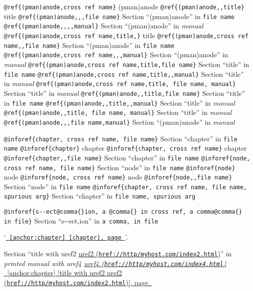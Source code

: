 \documentclass{book}
\begin{document}
\texttt{@ref\{(pman)anode,cross ref name\}} (pman)anode
\texttt{@ref\{(pman)anode,,title\}} title
\texttt{@ref\{(pman)anode,,,file name\}} Section ``(pman)anode'' in \texttt{file name}
\texttt{@ref\{(pman)anode,,,,manual\}} Section ``(pman)anode'' in \textsl{manual}
\texttt{@ref\{(pman)anode,cross ref name,title,\}} title
\texttt{@ref\{(pman)anode,cross ref name,,file name\}} Section ``(pman)anode'' in \texttt{file name}
\texttt{@ref\{(pman)anode,cross ref name,,,manual\}} Section ``(pman)anode'' in \textsl{manual}
\texttt{@ref\{(pman)anode,cross ref name,title,file name\}} Section ``title'' in \texttt{file name}
\texttt{@ref\{(pman)anode,cross ref name,title,,manual\}} Section ``title'' in \textsl{manual}
\texttt{@ref\{(pman)anode,cross ref name,title, file name, manual\}} Section ``title'' in \textsl{manual}
\texttt{@ref\{(pman)anode,,title,file name\}} Section ``title'' in \texttt{file name}
\texttt{@ref\{(pman)anode,,title,,manual\}} Section ``title'' in \textsl{manual}
\texttt{@ref\{(pman)anode,,title, file name, manual\}} Section ``title'' in \textsl{manual}
\texttt{@ref\{(pman)anode,,,file name,manual\}} Section ``(pman)anode'' in \textsl{manual}


\texttt{@inforef\{chapter, cross ref name, file name\}} Section ``chapter'' in \texttt{file name}
\texttt{@inforef\{chapter\}} chapter
\texttt{@inforef\{chapter, cross ref name\}} chapter
\texttt{@inforef\{chapter,,file name\}} Section ``chapter'' in \texttt{file name}
\texttt{@inforef\{node, cross ref name, file name\}} Section ``node'' in \texttt{file name}
\texttt{@inforef\{node\}} node
\texttt{@inforef\{node, cross ref name\}} node
\texttt{@inforef\{node,,file name\}} Section ``node'' in \texttt{file name}
\texttt{@inforef\{chapter, cross ref name, file name, spurious arg\}} Section ``chapter'' in \texttt{file name, spurious arg}

\texttt{@inforef\{s{-}{-}ect@comma\{\}ion, a @comma\{\} in cross
ref, a comma@comma\{\} in file\}}
Section ``s{-}{-}ect,ion'' in \texttt{a comma, in file}

`\texttt{\hyperref[anchor:chapter]{\chaptername~\ref*{anchor:chapter} [chapter], page~\pageref*{anchor:chapter}}}'.

Section ``title with uref2 \href{href://http/myhost.com/index2.html}{uref2 (\nolinkurl{href://http/myhost.com/index2.html})}'' in \textsl{printed manual with uref4 \href{href://http/myhost.com/index4.html}{uref4 (\nolinkurl{href://http/myhost.com/index4.html})}}
\hyperref[anchor:chapter]{\chaptername~\ref*{anchor:chapter} [title with uref2 \href{href://http/myhost.com/index2.html}{uref2 (\nolinkurl{href://http/myhost.com/index2.html})}], page~\pageref*{anchor:chapter}}
\end{document}
